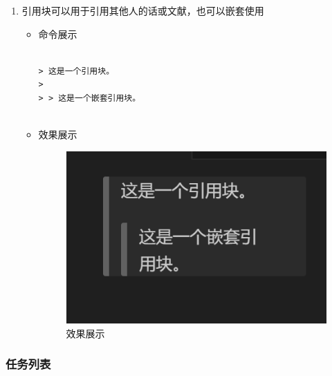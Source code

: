 \documentclass[UTF8]{ctexart}
\begin{document}
\begin{enumerate}
  \item 引用块可以用于引用其他人的话或文献，也可以嵌套使用
  \begin{itemize}
  \item 命令展示
  \begin{verbatim}

> 这是一个引用块。
> 
> > 这是一个嵌套引用块。


  \end{verbatim}
\item 效果展示
 \begin{figure}[H]
    \centering
    \includegraphics[width=\textwidth]{43} %
    \caption{效果展示}
  \end{figure}
  \end{itemize}
\end{enumerate}



\subsubsection{ 任务列表}
\end{document}
